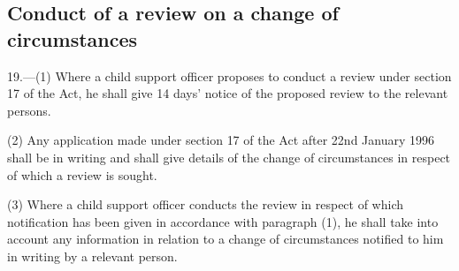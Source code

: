 \documentclass[a4paper]{article}
\newcommand{\parthead}{}
\begin{document}
\renewcommand\parthead{--- Part VI}

\subsection[19. Conduct of a review on a change of circumstances]{Conduct of a review on a change of circumstances}

19.—(1) Where a child support officer proposes to conduct a review under section 17 of the Act, he shall give 14 days' notice of the proposed review to the relevant persons.

%
%

(2) Any application made under section 17 of the Act after 22nd January 1996 shall be in writing and shall give details of the change of circumstances in respect of which a review is sought.

(3) Where a child support officer conducts the review in respect of which notification has been given in accordance with paragraph (1), he shall take into account any information in relation to a change of circumstances notified to him in writing by a relevant person.
\end{document}
